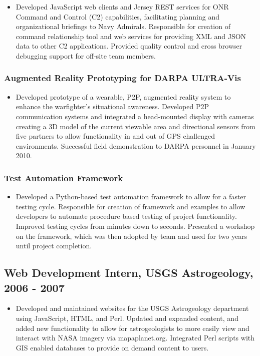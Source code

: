 \documentclass[11pt]{article}
\begin{document}
\begin{itemize}
\item Developed JavaScript web clients and Jersey REST services for ONR Command and Control (C2) capabilities, facilitating planning and organizational briefings to Navy Admirals. Responsible for creation of command relationship tool and web services for providing XML and JSON data to other C2 applications. Provided quality control and cross browser debugging support for off-site team members.
\end{itemize}
\subsubsection*{Augmented Reality Prototyping for DARPA ULTRA-Vis}
\label{sec-1.1.4}

\begin{itemize}
\item Developed prototype of a wearable, P2P, augmented reality system to enhance the warfighter's situational awareness. Developed P2P communication systems and integrated a head-mounted display with cameras creating a 3D model of the current viewable area and directional sensors from five partners to allow functionality in and out of GPS challenged environments. Successful field demonstration to DARPA personnel in January 2010.
\end{itemize}
\subsubsection*{Test Automation Framework}
\label{sec-1.1.5}

\begin{itemize}
\item Developed a Python-based test automation framework to allow for a faster testing cycle. Responsible for creation of framework and examples to allow developers to automate procedure based testing of project functionality. Improved testing cycles from minutes down to seconds. Presented a workshop on the framework, which was then adopted by team and used for two years until project completion.
\end{itemize}
\subsection*{Web Development Intern, USGS Astrogeology, 2006 - 2007}
\label{sec-1.2}

\begin{itemize}
\item Developed and maintained websites for the USGS Astrogeology department using JavaScript, HTML, and Perl. Updated and expanded content, and added new functionality to allow for astrogeologists to more easily view and interact with NASA imagery via mapaplanet.org. Integrated Perl scripts with GIS enabled databases to provide on demand content to users.
\end{itemize}
\end{document}
